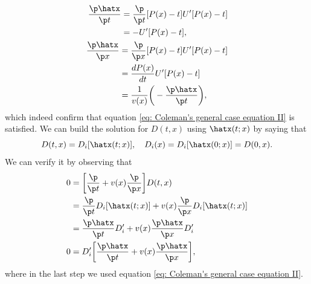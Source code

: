 \begin{align}
    \begin{split}
        \frac{\p\hatx}{\p t} &= \frac{\p}{\p t}[P(x) - t]U'[P(x) - t] \\
        &= -U'[P(x) - t],
    \end{split} \\
    \begin{split}
        \frac{\p\hatx}{\p x} &= \frac{\p}{\p x}[P(x) - t]U'[P(x) - t] \\
        &= \frac{dP(x)}{dt}U'[P(x) - t] \\
        &= \frac{1}{v(x)}\bigg(-\frac{\p\hatx}{\p t}\bigg),
    \end{split}
\end{align}
which indeed confirm that equation \eqref{eq: Coleman's general case equation II} is satisfied. We can build the solution for $D(t,x)$ using $\hatx(t;x)$ by saying that
\begin{equation}
    D(t,x) = D_i[\hatx(t;x)],\quad D_i(x) = D_i[\hatx(0;x)] = D(0,x).
\end{equation}
We can verify it by observing that  
\begin{equation}
    \begin{split}
        0 &= \bigg[\frac{\p}{\p t} + v(x)\frac{\p}{\p x}\bigg]D(t,x) \\
        &= \frac{\p}{\p t}D_i[\hatx(t;x)] + v(x)\frac{\p}{\p x}D_i[\hatx(t;x)] \\
        &= \frac{\p\hatx}{\p t}D'_i + v(x)\frac{\p\hatx}{\p x}D_i' \\
        0 &= D_i'\bigg[\frac{\p\hatx}{\p t} + v(x)\frac{\p\hatx}{\p x}\bigg],
    \end{split}
\end{equation}
where in the last step we used equation \eqref{eq: Coleman's general case equation II}.

